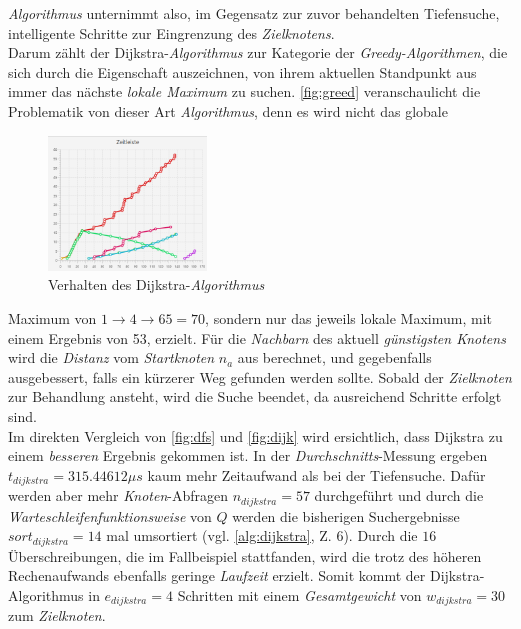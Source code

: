 \documentclass[12pt]{article}
\begin{document}
\noindent \textit{Algorithmus} unternimmt also, im Gegensatz zur zuvor behandelten Tiefensuche, intelligente Schritte zur Eingrenzung des \textit{Zielknotens}. 
\\
Darum zählt der Dijkstra-\textit{Algorithmus} zur Kategorie der \textit{Greedy-Algorithmen}, die sich durch die Eigenschaft auszeichnen, von ihrem aktuellen Standpunkt aus immer das nächste \textit{lokale Maximum} zu suchen. \autoref{fig:greed} veranschaulicht die Problematik von dieser Art \textit{Algorithmus}, denn es wird nicht das globale
\begin{figure}
\vspace{-20pt}
\begin{center}
\includegraphics[width=0.375\textwidth]{res/dijk_time.png}
\end{center}
\vspace{-30pt}
\centering
\caption{Verhalten des Dijkstra-\textit{Algorithmus}}
\label{fig:dijk-time}
\end{figure}

\noindent Maximum von $1 \to 4 \to 65 = 70$, sondern nur das jeweils lokale Maximum, mit einem Ergebnis von 53, erzielt. Für die \textit{Nachbarn} des aktuell \textit{günstigsten Knotens} wird die \textit{Distanz} vom \textit{Startknoten} $n_a$ aus berechnet, und gegebenfalls ausgebessert, falls ein kürzerer Weg gefunden werden sollte. Sobald der \textit{Zielknoten} zur Behandlung ansteht, wird die Suche beendet, da ausreichend Schritte erfolgt sind. 
\\
Im direkten Vergleich von \autoref{fig:dfs} und \autoref{fig:dijk} wird ersichtlich, dass Dijkstra zu einem \textit{besseren} Ergebnis gekommen ist. In der \textit{Durchschnitts}-Messung ergeben $t_{dijkstra} = 315.44612\mu s$ kaum mehr Zeitaufwand als bei der Tiefensuche. Dafür werden aber mehr \textit{Knoten}-Abfragen $n_{dijkstra} = 57$ durchgeführt und durch die \textit{Warteschleifenfunktionsweise} von $Q$ werden die bisherigen Suchergebnisse $sort_{dijkstra} = 14$ mal umsortiert (vgl. \autoref{alg:dijkstra}, Z. 6). Durch die $16$ Überschreibungen, die im Fallbeispiel stattfanden, wird die trotz des höheren Rechenaufwands ebenfalls geringe \textit{Laufzeit} erzielt. Somit kommt der Dijkstra-Algorithmus in $e_{dijkstra} = 4$ Schritten mit einem \textit{Gesamtgewicht} von $w_{dijkstra} = 30$ zum \textit{Zielknoten}.
\end{document}
